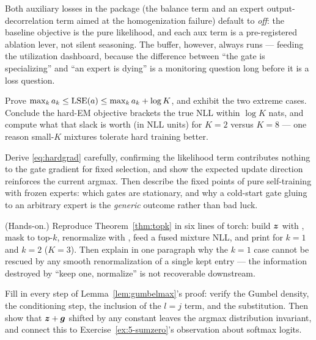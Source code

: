 Both auxiliary losses in the package (the balance term and an expert
output-decorrelation term aimed at the homogenization failure) default to
\emph{off}: the baseline objective is the pure likelihood, and each aux
term is a pre-registered ablation lever, not silent seasoning. The
buffer, however, always runs --- feeding the utilization dashboard,
because the difference between ``the gate is specializing'' and ``an
expert is dying'' is a monitoring question long before it is a loss
question.

\exercisehead

\begin{exercise}\label{ex:6-bound}
Prove $\max_k a_k \le \operatorname{LSE}(a) \le \max_k a_k + \log K$, and exhibit the
two extreme cases. Conclude the hard-EM objective brackets the true NLL
within $\log K$ nats, and compute what that slack is worth (in NLL units)
for $K = 2$ versus $K = 8$ --- one reason small-$K$ mixtures tolerate
hard training better.
\end{exercise}

\begin{exercise}\label{ex:6-hardgrad}
Derive \eqref{eq:hardgrad} carefully, confirming the likelihood term
contributes nothing to the gate gradient for fixed selection, and show
the expected update direction reinforces the current argmax. Then
describe the fixed points of pure self-training with frozen experts:
which gates are stationary, and why a cold-start gate gluing to an
arbitrary expert is the \emph{generic} outcome rather than bad luck.
\end{exercise}

\begin{exercise}\label{ex:6-topk}
(Hands-on.) Reproduce Theorem~\ref{thm:topk} in six lines of torch:
build $\bm{z}$ with , mask to top-$k$, renormalize with
, feed a fused mixture NLL, and print
 for $k = 1$ and $k = 2$ ($K = 3$). Then explain in one
paragraph why the $k=1$ case cannot be rescued by any smooth
renormalization of a single kept entry --- the information destroyed by
``keep one, normalize'' is not recoverable downstream.
\end{exercise}

\begin{exercise}\label{ex:6-gumbelproof}
Fill in every step of Lemma~\ref{lem:gumbelmax}'s proof: verify the
Gumbel density, the conditioning step, the inclusion of the $l = j$ term,
and the substitution. Then show that $\bm{z} + \bm{g}$ shifted by any
constant leaves the argmax distribution invariant, and connect this to
Exercise~\ref{ex:5-sumzero}'s observation about softmax logits.
\end{exercise}

